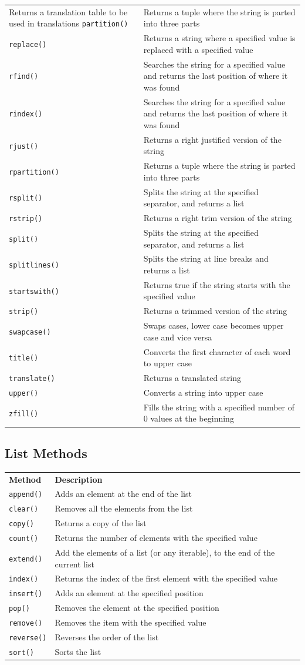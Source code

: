 \documentclass[12pt,a4paper]{article}
\newcommand{\lcode}[1]{%
	\lstinline{#1}%
}
\newcommand{\tcol}[2]{%
	\quad #1 & #2 \\
}
\begin{document}
\begin{center}
\begin{longtable}{p{} p{}}
		{Returns a translation table to be used in translations}
	\tcol{\lcode{partition()}}
		{Returns a tuple where the string is parted into three parts}
	\tcol{\lcode{replace()}}
		{Returns a string where a specified value is replaced with a specified value}
	\tcol{\lcode{rfind()}}
		{Searches the string for a specified value and returns the last position of where it was found}
	\tcol{\lcode{rindex()}}
		{Searches the string for a specified value and returns the last position of where it was found}
	\tcol{\lcode{rjust()}}
		{Returns a right justified version of the string}
	\tcol{\lcode{rpartition()}}
		{Returns a tuple where the string is parted into three parts}
	\tcol{\lcode{rsplit()}}
		{Splits the string at the specified separator, and returns a list}
	\tcol{\lcode{rstrip()}}
		{Returns a right trim version of the string}
	\tcol{\lcode{split()}}
		{Splits the string at the specified separator, and returns a list}
	\tcol{\lcode{splitlines()}}
		{Splits the string at line breaks and returns a list}
	\tcol{\lcode{startswith()}}
		{Returns true if the string starts with the specified value}
	\tcol{\lcode{strip()}}
		{Returns a trimmed version of the string}
	\tcol{\lcode{swapcase()}}
		{Swaps cases, lower case becomes upper case and vice versa}
	\tcol{\lcode{title()}}
		{Converts the first character of each word to upper case}
	\tcol{\lcode{translate()}}
		{Returns a translated string}
	\tcol{\lcode{upper()}}
		{Converts a string into upper case}
	\tcol{\lcode{zfill()}}
		{Fills the string with a specified number of 0 values at the beginning}
	\end{longtable}
\end{center}
\subsection{List Methods}\label{pyListMethod}

\begin{table}[h]
	\begin{center}
	\begin{tabularx}{.8\textwidth}{lXl}
		\tcol{\bfseries Method}{\bfseries Description}
\tcol{\lcode{append()}}{Adds an element at the end of the list}
\tcol{\lcode{clear()}}{Removes all the elements from the list}
\tcol{\lcode{copy()}}{Returns a copy of the list}
\tcol{\lcode{count()}}{Returns the number of elements with the specified value}
\tcol{\lcode{extend()}}{Add the elements of a list (or any iterable), to the end of the current list}
\tcol{\lcode{index()}}{Returns the index of the first element with the specified value}
\tcol{\lcode{insert()}}{Adds an element at the specified position}
\tcol{\lcode{pop()}}{Removes the element at the specified position}
\tcol{\lcode{remove()}}{Removes the item with the specified value}
\tcol{\lcode{reverse()}}{Reverses the order of the list}
\tcol{\lcode{sort()}}{Sorts the list}
	\end{tabularx}
	\end{center}
\end{table}
\vfill\newpage
\end{document}
